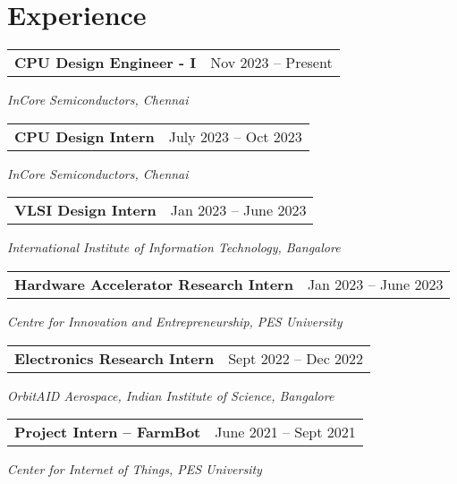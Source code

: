 \section{\sc Experience}

\begin{tabular}{@{}p{4in}p{2in}}
  {\bf{CPU Design Engineer - I}}  & Nov 2023 – Present \\
\end{tabular}  
\textit{InCore Semiconductors, Chennai} 

\begin{tabular}{@{}p{4in}p{2in}}
  {\bf{CPU Design Intern}}  & July 2023 – Oct 2023 \\
\end{tabular}  
\textit{InCore Semiconductors, Chennai} 


\begin{tabular}{@{}p{4in}p{2in}}
  {\bf{VLSI Design Intern}} & Jan 2023 – June 2023 \\
\end{tabular}
\textit{International Institute of Information Technology, Bangalore}  


\begin{tabular}{@{}p{4in}p{2in}}
  {\bf{Hardware Accelerator Research Intern}}  & Jan 2023 – June 2023 \\
\end{tabular}
\textit{Centre for Innovation and Entrepreneurship, PES University} 

\begin{tabular}{@{}p{4in}p{2in}}
  {\bf{Electronics Research Intern}} & Sept 2022 – Dec 2022 \\
\end{tabular}
\textit{OrbitAID Aerospace, Indian Institute of Science, Bangalore}  

\begin{tabular}{@{}p{4in}p{2in}}
  {\bf{Project Intern – FarmBot}} & June 2021 – Sept 2021 \\
\end{tabular}
\textit{Center for Internet of Things, PES University}  

\endinput
